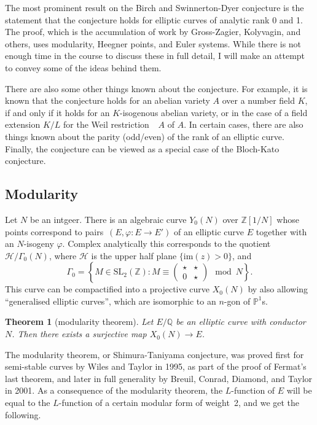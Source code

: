 \documentclass[12pt]{article}
\newtheorem{theorem}{Theorem}[section]
\theoremstyle{definition}
\numberwithin{equation}{subsection}
\newcommand{\Q}{\ensuremath{\mathbb{Q}}}
\newcommand{\Z}{\ensuremath{\mathbb{Z}}}
\begin{document}
The most prominent result on the Birch and Swinnerton-Dyer conjecture is the statement that the conjecture holds for elliptic curves of analytic rank 0 and 1.
The proof, which is the accumulation of work by Gross-Zagier, Kolyvagin, and others, uses modularity, Heegner points, and Euler systems.
While there is not enough time in the course to discuss these in full detail, I will make an attempt to convey some of the ideas behind them.

There are also some other things known about the conjecture.
For example, it is known that the conjecture holds for an abelian variety $A$ over a number field $K$, if and only if it holds for an $K$-isogenous abelian variety, or in the case of a field extension $K/L$ for the Weil restriction~$\mathop{\mathrm{Res}_{K/L}} A$ of $A$.
In certain cases, there are also things known about the parity (odd/even) of the rank of an elliptic curve.
Finally, the conjecture can be viewed as a special case of the Bloch-Kato conjecture.

\subsection{Modularity}

Let $N$ be an intgeer.
There is an algebraic curve $Y_0(N)$ over $\Z[1/N]$ whose points correspond to pairs~$(E, \varphi \colon E \to E')$ of an elliptic curve $E$ together with an $N$-isogeny $\varphi$.
Complex analytically this corresponds to the quotient $\mathcal{H} / \Gamma_0(N)$, where $\mathcal{H}$ is the upper half plane $\{\mathrm{im}(z) > 0\}$, and
$$\Gamma_0 = \left\{ M \in \mathrm{SL}_2(\Z) : M \equiv  \begin{pmatrix}\star &\star\\ 0 &\star \end{pmatrix} \mod N \right\}.$$
This curve can be compactified into a projective curve $X_0(N)$ by also allowing ``generalised elliptic curves'', which are isomorphic to an $n$-gon of $\mathbb{P}^1$s.

\begin{theorem}[modularity theorem]
Let $E/\Q$ be an elliptic curve with conductor $N$.
Then there exists a surjective map $X_0(N) \to E$.
\end{theorem}

The modularity theorem, or Shimura-Taniyama conjecture, was proved first for semi-stable curves by Wiles and Taylor in 1995, as part of the proof of Fermat's last theorem, and later in full generality by Breuil, Conrad, Diamond, and Taylor in 2001.
As a consequence of the modularity theorem, the $L$-function of $E$ will be equal to the $L$-function of a certain modular form of weight~2, and we get the following.
\end{document}
